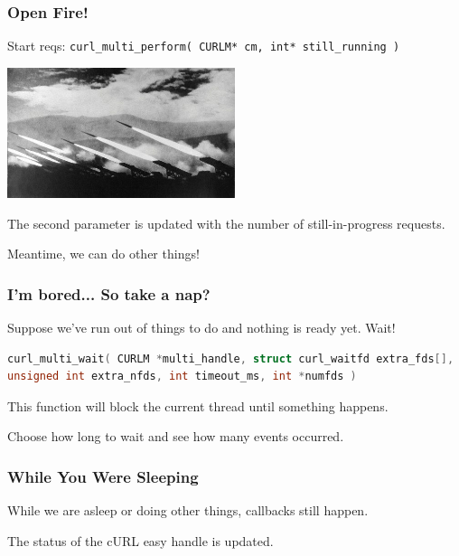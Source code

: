 \begin{frame}
\frametitle{Open Fire!}

Start reqs: \texttt{curl\_multi\_perform( CURLM* cm, int* still\_running )}

\begin{center}
\includegraphics[width=0.5\textwidth]{images/artillery.jpeg}
\end{center}

The second parameter is updated with the number of still-in-progress requests.

Meantime, we can do other things!

\end{frame}


\begin{frame}[fragile]
\frametitle{I'm bored... So take a nap?}

Suppose we've run out of things to do and nothing is ready yet. Wait!

\begin{lstlisting}[language=C]
curl_multi_wait( CURLM *multi_handle, struct curl_waitfd extra_fds[], 
unsigned int extra_nfds, int timeout_ms, int *numfds )
\end{lstlisting}

This function will block the current thread until something happens.

Choose how long to wait and see how many events occurred.

\end{frame}


\begin{frame}
\frametitle{While You Were Sleeping}

While we are asleep or doing other things, callbacks still happen.

The status of the cURL easy handle is updated.

\end{frame}




